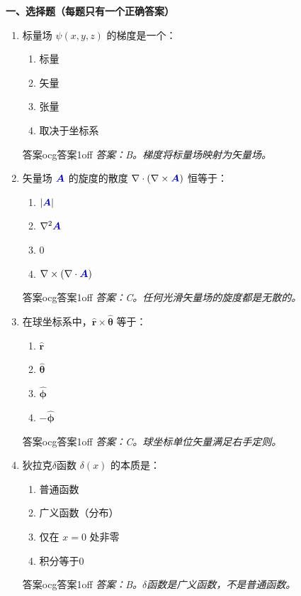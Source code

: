 \documentclass[11pt,a4paper,openany,oneside]{book}
\newcommand{\vecA}{\textcolor{blue!70!black}{\vect{A}}}
\newcommand{\vect}[1]{\bm{#1}}
\newcommand{\unitvec}[1]{\hat{\vect{#1}}}
\newcommand{\curl}{\nabla\times}
\newcommand{\divg}{\nabla\cdot}
\newcommand{\lap}{\nabla^2}
\begin{document}
\begin{miniquiz}
\textbf{一、选择题（每题只有一个正确答案）}
\begin{enumerate}[label=\arabic*.]
\item 标量场 $\psi(x,y,z)$ 的梯度是一个：
  \begin{enumerate}[label=(\Alph*),nosep]
  \item 标量
  \item 矢量
  \item 张量
  \item 取决于坐标系
  \end{enumerate}
\begin{ocg}{答案}{ocg答案1}{off}
  \textit{答案：B。梯度将标量场映射为矢量场。}
\end{ocg}

\item 矢量场 $\vecA$ 的旋度的散度 $\divg(\curl\vecA)$ 恒等于：
  \begin{enumerate}[label=(\Alph*),nosep]
  \item $|\vecA|$
  \item $\lap\vecA$
  \item $0$
  \item $\curl(\divg\vecA)$
  \end{enumerate}
\begin{ocg}{答案}{ocg答案1}{off}
  \textit{答案：C。任何光滑矢量场的旋度都是无散的。}
\end{ocg}

\item 在球坐标系中，$\unitvec{r} \times \unitvec{\theta}$ 等于：
  \begin{enumerate}[label=(\Alph*),nosep]
  \item $\unitvec{r}$
  \item $\unitvec{\theta}$
  \item $\unitvec{\phi}$
  \item $-\unitvec{\phi}$
  \end{enumerate}
\begin{ocg}{答案}{ocg答案1}{off}
  \textit{答案：C。球坐标单位矢量满足右手定则。}
\end{ocg}

\item 狄拉克$\delta$函数 $\delta(x)$ 的本质是：
  \begin{enumerate}[label=(\Alph*),nosep]
  \item 普通函数
  \item 广义函数（分布）
  \item 仅在 $x=0$ 处非零
  \item 积分等于0
  \end{enumerate}
\begin{ocg}{答案}{ocg答案1}{off}
  \textit{答案：B。$\delta$函数是广义函数，不是普通函数。}
\end{ocg}
\end{enumerate}


\end{miniquiz}
\end{document}
